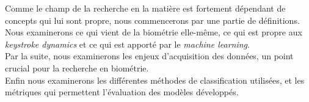 Comme le champ de la recherche en la matière est fortement dépendant de concepts qui lui sont propre, nous commencerons par une partie de définitions. Nous examinerons ce qui vient de la biométrie elle-même, ce qui est propre aux \textit{keystroke dynamics} et ce qui est apporté par le \textit{machine learning}.\\

Par la suite, nous examinerons les enjeux d'acquisition des données, un point crucial pour la recherche en biométrie.\\

Enfin nous examinerons les différentes méthodes de classification utilisées, et les métriques qui permettent l'évaluation des modèles développés.

